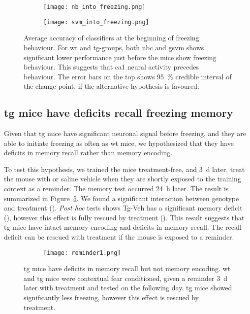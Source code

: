 \begin{figure}[h]
    \begin{subfigure}[h]{\textwidth}
        \texttt{[image: nb\_into\_freezing.png]}
        \caption{\label{f.ad.nb_into_f}}
    \end{subfigure}
    \begin{subfigure}[h]{\textwidth}
        \texttt{[image: svm\_into\_freezing.png]}
        \caption{\label{f.ad.svm_into_f}}
    \end{subfigure}
    \caption{Average accuracy of classifiers at the beginning of freezing behaviour. For \gls{wt} and \gls{tg}-\glu groups, both \gls{nbc} and \gls{gsvm} shows significant lower performance just before the mice show freezing behaviour. This suggests that \gls{ca1} neural activity precedes behaviour. The error bars on the top shows \SI{95}{\percent} credible interval of the change point, if the alternative hypothesis is favoured. \label{f.ad.into_f}}
\end{figure}


\subsection{\Gls{tg} mice have deficits recall freezing memory}
Given that \gls{tg} mice have significant neuronal signal before freezing, and they are able to initiate freezing as often as \gls{wt} mice, we hypothesized that they have deficits in memory recall rather than memory encoding. 

To test this hypothesis, we trained the mice treatment-free, and \SI{3}{\day} later, treat the mouse with \tglu or saline vehicle when they are shortly exposed to the training context as a reminder. The memory test occurred \SI{24}{\hour} later. The result is summarized in Figure~\ref{f.ad.reminder1}. We found a significant interaction between genotype and treatment (). \textit{Post hoc} tests shows Tg-Veh has a significant memory deficit (), however this effect is fully rescued by \tglu treatment (). This result suggests that \gls{tg} mice have intact memory encoding and deficits in memory recall. The recall deficit can be rescued with \tglu treatment if the mouse is exposed to a reminder.

\begin{figure}[h]
    \begin{subfigure}[h]{\textwidth}
        \texttt{[image: reminder1.png]}
        \caption{\label{f.ad.actf}}
    \end{subfigure}
    \caption{\gls{tg} mice have deficits in memory recall but not memory encoding. \gls{wt} and \gls{tg} mice were contextual fear conditioned, given a reminder \SI{3}{\day} later with treatment and tested on the following day. \gls{tg} mice showed significantly less freezing, however this effect is rescued by \tglu treatment. \label{f.ad.reminder1}}
\end{figure}

